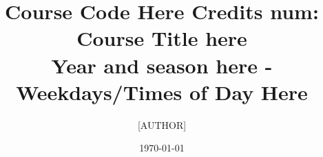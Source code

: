 


\newcommand{\myAuthor}              {[AUTHOR]} %
\newcommand{\mySubject}             {PDF Subject Here}  %
\newcommand{\myKeywords}            {PDF Keywords Here} %
\newcommand{\myCourseDateCreated}   {Created Date Here}
\newcommand{\myCourseDateUpdated}   {\today}
\newcommand{\myCourseCredits}       {Credits num}
\newcommand{\myCourseCode}          {Course Code Here}
\newcommand{\myCourseTitle}         {Course Title here}
\newcommand{\myCourseProf}          {Course Prof Here}    %
\newcommand{\myCourseSemester}      {Year and season here} %
\newcommand{\myCourseSchedule}      {Weekdays/Times of Day Here} %
\newcommand{\myCourseSection}       {Section Here} %
\newcommand{\myCourseLocation}      {Course Location}
\newcommand{\myTitle}{\myCourseCode{} \myCourseCredits{}: \myCourseTitle{} \\ \myCourseSemester{} - \myCourseSchedule{}}

\newcommand{\comment}[1]{}                          %
\newcommand{\image}[1]{[\textbf{IMAGE MISSING #1}]} %
\newenvironment{itemize*}{\begin{itemize}\setlength{\itemsep}{0pt}\setlength{\parskip}{0pt}}{\end{itemize}}
\newenvironment{enumerate*}{\begin{enumerate}\setlength{\itemsep}{0pt}\setlength{\parskip}{0pt}}{\end{enumerate}}

\documentclass{article}
\title{\myTitle}
\author{\myAuthor}
\date{\myCourseDateUpdated}

\usepackage{hyperref}   %
\usepackage{listings}   %
\usepackage{graphicx}   %
\usepackage{enumitem}

